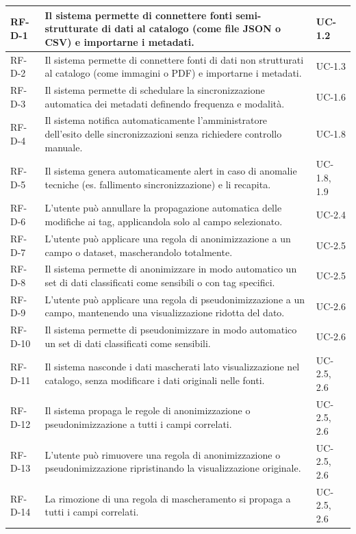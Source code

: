 \begin{longtable}{ p{} p{} p{} }
RF-D-1 & Il sistema permette di connettere fonti semi-strutturate di dati al catalogo (come file JSON o CSV) e importarne i metadati. & UC-1.2 \\ \midrule
RF-D-2 & Il sistema permette di connettere fonti di dati non strutturati al catalogo (come immagini o PDF) e importarne i metadati. & UC-1.3 \\ \midrule
RF-D-3 & Il sistema permette di schedulare la sincronizzazione automatica dei metadati definendo frequenza e modalità. & UC-1.6 \\ \midrule
RF-D-4 & Il sistema notifica automaticamente l'amministratore dell'esito delle sincronizzazioni senza richiedere controllo manuale. & UC-1.8 \\ \midrule
RF-D-5 & Il sistema genera automaticamente alert in caso di anomalie tecniche (es. fallimento sincronizzazione) e li recapita. & UC-1.8, 1.9 \\ \midrule
RF-D-6 & L'utente può annullare la propagazione automatica delle modifiche ai tag, applicandola solo al campo selezionato. & UC-2.4 \\ \midrule
RF-D-7 & L'utente può applicare una regola di anonimizzazione a un campo o dataset, mascherandolo totalmente. & UC-2.5 \\ \midrule
RF-D-8 & Il sistema permette di anonimizzare in modo automatico un set di dati classificati come sensibili o con tag specifici. & UC-2.5 \\ \midrule
RF-D-9 & L'utente può applicare una regola di pseudonimizzazione a un campo, mantenendo una visualizzazione ridotta del dato. & UC-2.6 \\ \midrule
RF-D-10 & Il sistema permette di pseudonimizzare in modo automatico un set di dati classificati come sensibili. & UC-2.6 \\ \midrule
RF-D-11 & Il sistema nasconde i dati mascherati lato visualizzazione nel catalogo, senza modificare i dati originali nelle fonti. & UC-2.5, 2.6 \\ \midrule
RF-D-12 & Il sistema propaga le regole di anonimizzazione o pseudonimizzazione a tutti i campi correlati. & UC-2.5, 2.6 \\ \midrule
RF-D-13 & L'utente può rimuovere una regola di anonimizzazione o pseudonimizzazione ripristinando la visualizzazione originale. & UC-2.5, 2.6 \\ \midrule
RF-D-14 & La rimozione di una regola di mascheramento si propaga a tutti i campi correlati. & UC-2.5, 2.6 \\ \midrule

\end{longtable}
